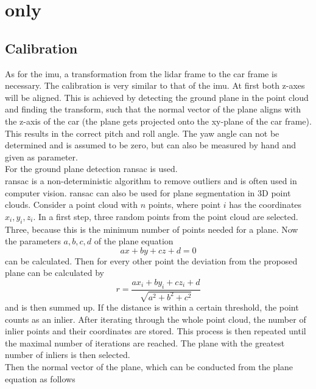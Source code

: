 \section{ only}
\subsection{Calibration}
As for the \gls{imu}, a transformation from the \gls{lidar} frame to the car frame is necessary.
The calibration is very similar to that of the \gls{imu}.
At first both z-axes will be aligned.
This is achieved by detecting the ground plane in the point cloud and finding the transform, such that the normal vector of the plane aligns with the z-axis of the car (the plane gets projected onto the xy-plane of the car frame).
This results in the correct pitch and roll angle.
The yaw angle can not be determined and is assumed to be zero, but can also be measured by hand and given as parameter.\\
For the ground plane detection \gls{ransac} \cite{Fischler1981} is used.\\
\gls{ransac} is a non-deterministic algorithm to remove outliers and is often used in computer vision.
\gls{ransac} can also be used for plane segmentation in 3D point clouds.
Consider a point cloud with $n$ points, where point $i$ has the coordinates $x_i, y_i, z_i$.
In a first step, three random points from the point cloud are selected.
Three, because this is the minimum number of points needed for a plane.
Now the parameters $a, b, c, d$ of the plane equation
\begin{equation}
	ax + by + cz + d = 0
\end{equation}
can be calculated.
Then for every other point the deviation from the proposed plane can be calculated by
\begin{equation}
	r = \frac{ax_i + by_i + cz_i + d}{\sqrt{a^2 + b^2 + c^2}}
\end{equation}
and is then summed up.
If the distance is within a certain threshold, the point counts as an inlier.
After iterating through the whole point cloud, the number of inlier points and their coordinates are stored.
This process is then repeated until the maximal number of iterations are reached.
The plane with the greatest number of inliers is then selected.\\
Then the normal vector of the plane, which can be conducted from the plane equation as follows
